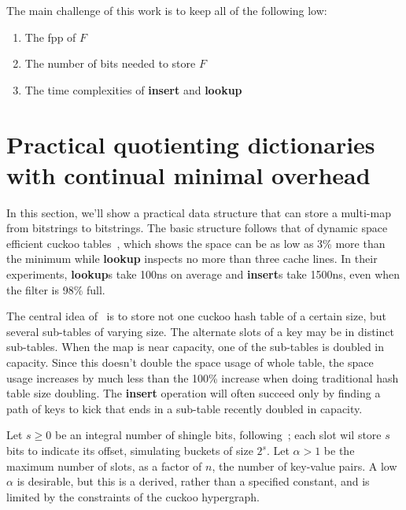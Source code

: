 \documentclass[11pt,letterpaper]{article}
\begin{document}
The main challenge of this work is to keep all of the following low:

\begin{enumerate}
\item The fpp of $F$
\item The number of bits needed to store $F$
\item The time complexities of {\bf insert} and {\bf lookup}
\end{enumerate}

\section{Practical quotienting dictionaries with continual minimal overhead}


In this section, we'll show a practical data structure that can store a multi-map from bitstrings to bitstrings.
The basic structure follows that of dynamic space efficient cuckoo tables~\cite{maier2019dynamic}, which shows the space can be as low as 3\% more than the minimum while {\bf lookup} inspects no more than three cache lines.
In their experiments, {\bf lookup}s take 100ns on average and {\bf insert}s take 1500ns, even when the filter is 98\% full.

The central idea of~\cite{maier2019dynamic} is to store not one cuckoo hash table of a certain size, but several sub-tables of varying size.
The alternate slots of a key may be in distinct sub-tables.
When the map is near capacity, one of the sub-tables is doubled in capacity.
Since this doesn't double the space usage of whole table, the space usage increases by much less than the 100\% increase when doing traditional hash table size doubling.
The {\bf insert} operation will often succeed only by finding a path of keys to kick that ends in a sub-table recently doubled in capacity.


Let $s \geq 0$ be an integral number of shingle bits, following~\cite{lehman20093}; each slot wil store $s$ bits to indicate its offset, simulating buckets of size $2^s$.
Let $\alpha > 1$ be the maximum number of slots, as a factor of $n$, the number of key-value pairs.
A low $\alpha$ is desirable, but this is a derived, rather than a specified constant, and is limited by the constraints of the cuckoo hypergraph.
\end{document}

